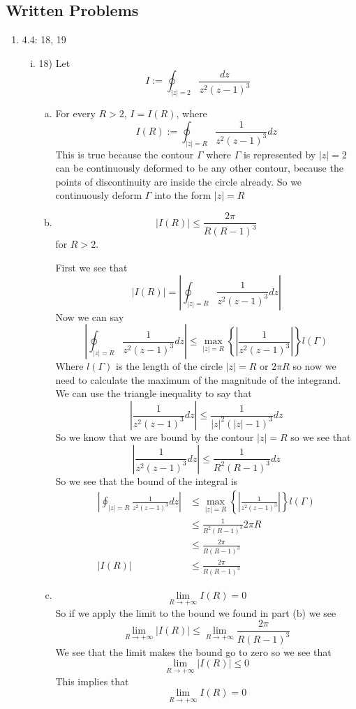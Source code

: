 \documentclass[11pt]{article}
\begin{document}

\subsection*{Written Problems}
\begin{enumerate}
\item 4.4: 18, 19  
\begin{enumerate}[(i)]
\item 18)
Let 
$$I:=\oint_{|z|=2} \frac{dz}{z^2(z-1)^3}$$
\begin{enumerate}[(a)]
\item For every $R>2$, $I=I(R)$, where
$$I(R) := \oint_{|z|=R}\frac{1}{z^2(z-1)^3}dz$$
This is true because the contour $\Gamma$ where $\Gamma$ is represented by $|z|=2$ can be continuously deformed to be any other contour, because the points of discontinuity are inside the circle already. So we continuously deform $\Gamma$ into the form $|z|=R$
\item
$$|I(R)| \le \frac{2\pi}{R(R-1)^3}$$ for $R>2$. 

First we see that
$$|I(R)|= \left|\oint_{|z|=R}\frac{1}{z^2(z-1)^3}dz\right|$$
Now we can say
$$\left|\oint_{|z|=R}\frac{1}{z^2(z-1)^3}dz\right|\le \max_{|z|=R}\left\{\left|\frac{1}{z^2(z-1)^3}\right|\right\}l(\Gamma)$$
Where $l(\Gamma)$ is the length of the circle $|z|=R$ or $2\pi R$ so now we need to calculate the maximum of the magnitude of the integrand. We can use the triangle inequality to say that
$$\left|\frac{1}{z^2(z-1)^3}dz\right| \le \frac{1}{|z|^2(|z|-1)^3}dz$$
So we know that we are bound by the contour $|z|=R$ so we see that
$$\left|\frac{1}{z^2(z-1)^3}dz\right| \le \frac{1}{R^2(R-1)^3}dz$$
So we see that the bound of the integral is 
\begin{align*}
\left|\oint_{|z|=R}\frac{1}{z^2(z-1)^3}dz\right| &\le \max_{|z|=R}\left\{\left|\frac{1}{z^2(z-1)^3}\right|\right\}l(\Gamma)\\
&\le \frac{1}{R^2(R-1)^3}2\pi R\\
&\le \frac{2\pi}{R(R-1)^3}\\
|I(R)| &\le \frac{2\pi}{R(R-1)^3}
\end{align*}

\item
$$\lim_{R\rightarrow+\infty} I(R)=0$$
So if we apply the limit to the bound we found in part (b) we see
$$\lim_{R\rightarrow+\infty} |I(R)|\le \lim_{R\rightarrow+\infty}\frac{2\pi}{R(R-1)^3}$$
We see that the limit makes the bound go to zero so we see that
$$\lim_{R\rightarrow+\infty} |I(R)|\le 0$$
This implies that
$$\lim_{R\rightarrow+\infty} I(R) = 0$$


\end{enumerate}
\end{enumerate}
\end{enumerate}
\end{document}
